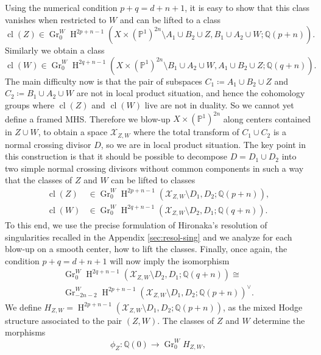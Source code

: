 \documentclass[11pt,a4paper]{amsart}
\renewcommand{\P}{\mathds{P}}
\newcommand{\Q}{\mathds{Q}}
\newcommand{\caX}{\mathcal{X}}
\DeclareMathOperator {\Gr} {Gr}
\DeclareMathOperator {\cl}{cl}
\DeclareMathOperator{\rH}{H}
\numberwithin{equation}{section}
\theoremstyle{plain}
\theoremstyle{definition}
\begin{document}
Using the numerical condition $p+q=d+n+1$, it is easy to show that this class vanishes when restricted to $W$ and
can be lifted to a class
\begin{displaymath}
  \cl(Z)\in \Gr^{W}_0\rH^{2p+n-1}(X\times (\P^1)^{2n}\setminus A_1\cup B_2\cup
  Z,B_1\cup A_2\cup W;\Q(p+n)).
\end{displaymath}
Similarly we obtain a class
\begin{displaymath}
    \cl(W)\in \Gr^{W}_0\rH^{2q+n-1}(X\times (\P^1)^{2n}\setminus B_1\cup A_2\cup
  W,A_1\cup B_2\cup Z;\Q(q+n)).
\end{displaymath}
The main difficulty now is that the pair of subspaces
$C_1\coloneqq A_1\cup B_2\cup
Z$ and $C_2\coloneqq B_1\cup A_2\cup W$ are not in local product situation, and
hence the cohomology groups where $ \cl(Z)$ and $\cl(W)$ live
are not in duality. So we cannot yet define a framed MHS. Therefore we
blow-up $X\times 
(\P^1)^{2n}$ 
along centers contained in $Z\cup W$, to obtain a space $\caX_{Z,W}$
where the total transform of
$C_1\cup C_2$ is a normal crossing divisor $D$, so we are in local
product situation. The key point in this construction is that it should be
possible to decompose $D=D_1\cup D_2$ into two simple normal
crossing
divisors without common components in such a way that the classes of
$Z$ and $W$ can be lifted to classes
\begin{align*}
  \cl(Z)&\in \Gr_0^W\rH^{2p+n-1}(\caX_{Z,W}\setminus D_1,D_2;\Q(p+n)),\\
  \cl(W)&\in \Gr_0^W\rH^{2q+n-1}(\caX_{Z,W}\setminus D_2,D_1;\Q(q+n)).
\end{align*}
To this end, we use the precise formulation of Hironaka's resolution
of singularities recalled in the Appendix \ref{sec:resol-sing} and we
analyze for each blow-up on a smooth center, how to lift the
classes.
Finally, once again, the condition $p+q=d+n+1$ will now imply the isomorphism
\begin{multline*}
  \Gr_0^W\rH^{2q+n-1}(\caX_{Z,W}\setminus D_2,D_1;\Q(q+n))\cong \\
  \Gr_{-2n-2}^W\rH^{2p+n-1}(\caX_{Z,W}\setminus
  D_1,D_2;\Q(p+n))^{\vee}. 
\end{multline*}
We define $H_{Z,W}=\rH^{2p+n-1}(\caX_{Z,W}\setminus
  D_1,D_2;\Q(p+n))$, as the mixed Hodge structure associated to the pair $(Z,W)$. The classes of $Z$ and $W$ determine the morphisms
\begin{displaymath}
\phi_{Z}\colon \Q(0)\rightarrow \Gr^{W}_{0}H_{Z,W},
\end{displaymath}
\end{document}
